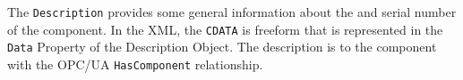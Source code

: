 The \texttt{Description} provides some general information about the \nmanufacture and serial number of the component.
In the XML, the \texttt{CDATA} is freeform \ntext that is represented in the \texttt{Data} Property of the Description Object.
The description is \nrelated to the component with the OPC/UA \texttt{HasComponent} relationship.